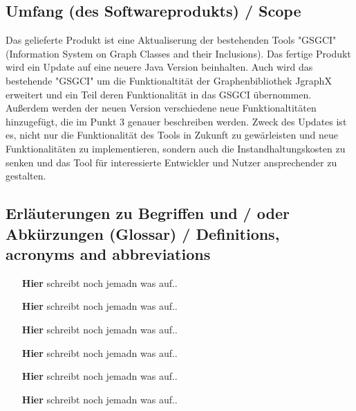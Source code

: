 \documentclass[11pt,a4paper]{article}
\begin{document}
  	\subsection{Umfang (des Softwareprodukts) / Scope} %
   Das gelieferte Produkt ist eine Aktualiserung der bestehenden Tools "GSGCI" (Information System on Graph Classes and their Inclusions). Das fertige Produkt wird ein Update auf eine neuere Java Version beinhalten. Auch wird das bestehende "GSGCI" um die Funktionaltität der Graphenbibliothek JgraphX erweitert und ein Teil deren Funktionalität in das GSGCI übernommen. Außerdem werden der neuen Version verschiedene neue Funktionaltitäten hinzugefügt, die im Punkt 3 genauer beschreiben werden. Zweck des Updates ist es, nicht nur die Funktionalität des Tools in Zukunft zu gewärleisten und neue Funktionalitäten zu implementieren, sondern auch die Instandhaltungskosten zu senken und das Tool für interessierte Entwickler und Nutzer ansprechender zu gestalten.

  	\subsection{Erläuterungen zu Begriffen und / oder Abkürzungen (Glossar) / Definitions, acronyms and abbreviations} %

	        \begin{itemize}
	        	\item[\bf{Hier}] schreibt noch jemadn was auf..
	        	\item[\bf{Hier}] schreibt noch jemadn was auf..
	        	\item[\bf{Hier}] schreibt noch jemadn was auf..
	        	\item[\bf{Hier}] schreibt noch jemadn was auf..
	        	\item[\bf{Hier}] schreibt noch jemadn was auf..
	        	\item[\bf{Hier}] schreibt noch jemadn was auf..
	        \end{itemize}
	        
\end{document}
